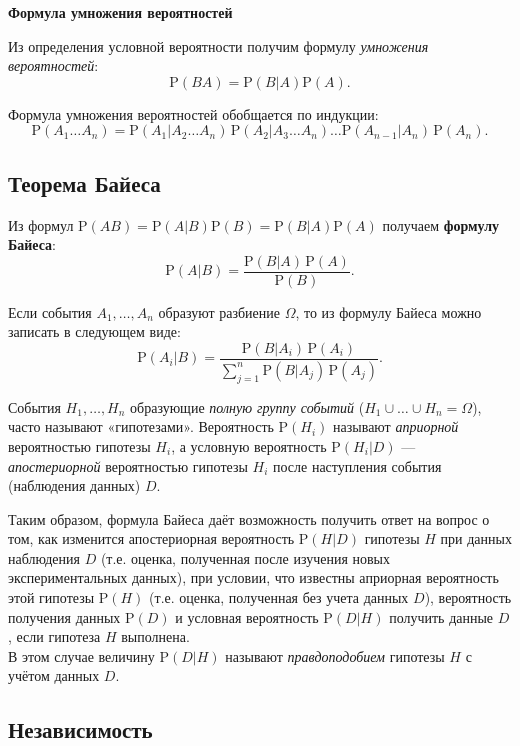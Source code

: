 \documentclass[11pt,a4paper]{article}
\begin{document}
    \textbf{Формула умножения вероятностей}

Из определения условной вероятности получим формулу \emph{умножения
вероятностей}: \[ \mathrm{P}(BA) = \mathrm{P}(B|A) \mathrm{P}(A). \]

Формула умножения вероятностей обобщается по индукции: \[
\mathrm{P}(A_1 \ldots A_n) = \mathrm{P}(A_1|A_2 \ldots A_{n}) \, \mathrm{P}(A_2|A_3 \ldots A_{n}) \ldots \mathrm{P}(A_{n-1} |A_n) \, \mathrm{P}(A_n).
\]


    \hypertarget{ux442ux435ux43eux440ux435ux43cux430-ux431ux430ux439ux435ux441ux430}{%
\subsection{Теорема
Байеса}\label{ux442ux435ux43eux440ux435ux43cux430-ux431ux430ux439ux435ux441ux430}}

Из формул
\(\mathrm{P}(AB) = \mathrm{P}(A|B)\mathrm{P}(B) = \mathrm{P}(B|A)\mathrm{P}(A)\)
получаем \textbf{формулу Байеса}: \[
  \mathrm{P}(A|B) = \dfrac{\mathrm{P}(B|A) \, \mathrm{P}(A)}{\mathrm{P}(B)}.
\]

Если события \(A_1, \dots, A_n\) образуют разбиение \(\Omega\), то из
формулу Байеса можно записать в следующем виде: \[
  \mathrm{P}(A_i|B) = \frac{\mathrm{P}(B|A_i) \, \mathrm{P}(A_i)}{\sum_{j=1}^{n} \mathrm{P}(B|A_j) \,\mathrm{P}(A_j)}.
\]

    События \(H_1, \dots, H_n\) образующие \emph{полную группу событий}
(\(H_1 \cup \dots \cup H_n = \Omega\)), часто называют «гипотезами».
Вероятность \(\mathrm{P}(H_i)\) называют \emph{априорной} вероятностью
гипотезы \(H_i\), а условную вероятность \(\mathrm{P}(H_i|D)\) ---
\emph{апостериорной} вероятностью гипотезы \(H_i\) после наступления
события (наблюдения данных) \(D\).

Таким образом, формула Байеса даёт возможность получить ответ на вопрос
о том, как изменится апостериорная вероятность \(\mathrm{P}(H|D)\)
гипотезы \(H\) при данных наблюдения \(D\) (т.е. оценка, полученная
после изучения новых экспериментальных данных), при условии, что
известны априорная вероятность этой гипотезы \(\mathrm{P}(H)\) (т.е.
оценка, полученная без учета данных \(D\)), вероятность получения данных
\(\mathrm{P}(D)\) и условная вероятность \(\mathrm{P}(D|H)\) получить
данные \(D\), если гипотеза \(H\) выполнена.\\
В этом случае величину \(\mathrm{P}(D|H)\) называют
\emph{правдоподобием} гипотезы \(H\) с учётом данных \(D\).

    \hypertarget{ux43dux435ux437ux430ux432ux438ux441ux438ux43cux43eux441ux442ux44c}{%
\subsection{Независимость}\label{ux43dux435ux437ux430ux432ux438ux441ux438ux43cux43eux441ux442ux44c}}
\end{document}
